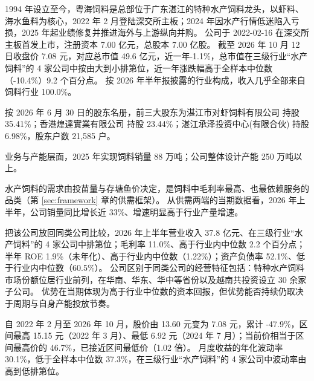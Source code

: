  1994 年设立至今，粤海饲料是总部位于广东湛江的特种水产饲料龙头，以虾料、海水鱼料为核心，2022 年 2 月登陆深交所主板；2024 年因水产行情低迷陷入亏损，2025 年起业绩修复并推进海外与上游纵向并购。 公司于 2022-02-16 在深交所主板首发上市，注册资本 7.00 亿元，总股本 7.00 亿股。 截至 2026 年 10 月 12 日收盘价 7.08 元，对应总市值 49.6 亿元，近一年-1.1\%，总市值在三级行业“水产饲料”的 4 家公司中按由大到小排第位，近一年涨跌幅高于全样本中位数（-10.4\%）9.2 个百分点。 按 2026 年半年报披露的行业构成，收入几乎全部来自饲料行业 100.0\%。

 按 2026 年 6 月 30 日的股东名册，前三大股东为湛江市对虾饲料有限公司 持股 35.41\%；香港煌達實業有限公司 持股 23.44\%；湛江承泽投资中心(有限合伙) 持股 6.98\%，股东户数 21,585 户。

 业务与产能层面，2025 年实现饲料销量 88 万吨；公司整体设计产能 250 万吨以上。

 水产饲料的需求由投苗量与存塘鱼价决定，是饲料中毛利率最高、也最依赖服务的品类（第 \ref{sec:framework} 章的供需框架）。 从供需两端的当期数据看，2026 年上半年，公司销量同比增长近 33\%、增速明显高于行业产量增速。

 把该公司放回同类公司比较，2026 年上半年营业收入 37.8 亿元、在三级行业“水产饲料”的 4 家公司中排第位；毛利率 11.0\%、高于行业内中位数 2.2 个百分点；半年 ROE 1.9\%（未年化）、高于行业内中位数（1.22\%）；资产负债率 52.1\%、低于行业内中位数（60.5\%）。 公司区别于同类公司的经营特征包括：特种水产饲料市场份额位居行业前列，在华南、华东、华中等省份以及越南共投资设立 30 余家子公司。 优势在当期体现为高于行业中位数的资本回报，但优势能否持续仍取决于周期与自身产能投放节奏。

 自 2022 年 2 月至 2026 年 10 月，股价由 13.60 元变为 7.08 元，累计 -47.9\%，区间最高 15.15 元（2022 年 3 月）、最低 6.92 元（2024 年 7 月）；当前价相当于区间最高价的 46.7\%，已接近区间最低价（1.02 倍）。 月度收益的年化波动率 30.1\%，低于全样本中位数 37.3\%，在三级行业“水产饲料”的 4 家公司中波动率由高到低排第位。

